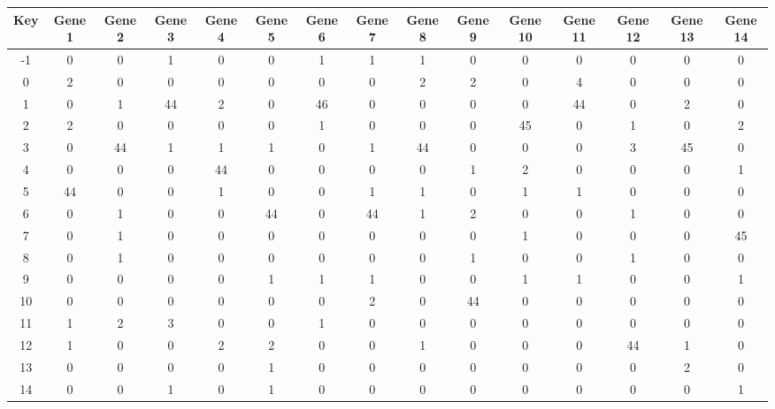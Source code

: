 \begin{tabular}{|c|c|c|c|c|c|c|c|c|c|c|c|c|c|c|}
\hline
Key & Gene 1 & Gene 2 & Gene 3 & Gene 4 & Gene 5 & Gene 6 & Gene 7 & Gene 8 & Gene 9 & Gene 10 & Gene 11 & Gene 12 & Gene 13 & Gene 14 \\
\hline
-1 & 0 & 0 & 1 & 0 & 0 & 1 & 1 & 1 & 0 & 0 & 0 & 0 & 0 & 0 \\
0 & 2 & 0 & 0 & 0 & 0 & 0 & 0 & 2 & 2 & 0 & 4 & 0 & 0 & 0 \\
1 & 0 & 1 & 44 & 2 & 0 & 46 & 0 & 0 & 0 & 0 & 44 & 0 & 2 & 0 \\
2 & 2 & 0 & 0 & 0 & 0 & 1 & 0 & 0 & 0 & 45 & 0 & 1 & 0 & 2 \\
3 & 0 & 44 & 1 & 1 & 1 & 0 & 1 & 44 & 0 & 0 & 0 & 3 & 45 & 0 \\
4 & 0 & 0 & 0 & 44 & 0 & 0 & 0 & 0 & 1 & 2 & 0 & 0 & 0 & 1 \\
5 & 44 & 0 & 0 & 1 & 0 & 0 & 1 & 1 & 0 & 1 & 1 & 0 & 0 & 0 \\
6 & 0 & 1 & 0 & 0 & 44 & 0 & 44 & 1 & 2 & 0 & 0 & 1 & 0 & 0 \\
7 & 0 & 1 & 0 & 0 & 0 & 0 & 0 & 0 & 0 & 1 & 0 & 0 & 0 & 45 \\
8 & 0 & 1 & 0 & 0 & 0 & 0 & 0 & 0 & 1 & 0 & 0 & 1 & 0 & 0 \\
9 & 0 & 0 & 0 & 0 & 1 & 1 & 1 & 0 & 0 & 1 & 1 & 0 & 0 & 1 \\
10 & 0 & 0 & 0 & 0 & 0 & 0 & 2 & 0 & 44 & 0 & 0 & 0 & 0 & 0 \\
11 & 1 & 2 & 3 & 0 & 0 & 1 & 0 & 0 & 0 & 0 & 0 & 0 & 0 & 0 \\
12 & 1 & 0 & 0 & 2 & 2 & 0 & 0 & 1 & 0 & 0 & 0 & 44 & 1 & 0 \\
13 & 0 & 0 & 0 & 0 & 1 & 0 & 0 & 0 & 0 & 0 & 0 & 0 & 2 & 0 \\
14 & 0 & 0 & 1 & 0 & 1 & 0 & 0 & 0 & 0 & 0 & 0 & 0 & 0 & 1 \\
\hline
\end{tabular}